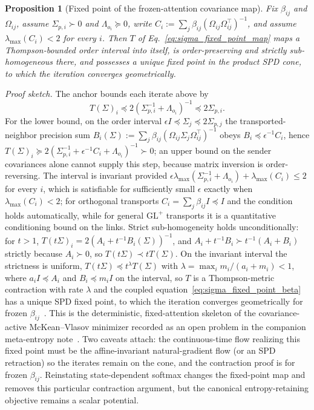 \documentclass[11pt]{article}
\newtheorem{proposition}{Proposition}
\begin{document}
\begin{proposition}[Fixed point of the frozen-attention covariance map]
Fix $\beta_{ij}$ and $\Omega_{ij}$, assume $\Sigma_{p,i} \succ 0$ and $\Lambda_{o_i} \succeq 0$, write $C_i := \sum_j \beta_{ij}(\Omega_{ij}\Omega_{ij}^\top)^{-1}$, and assume $\lambda_{\max}(C_i) < 2$ for every $i$. Then $T$ of Eq.~\eqref{eq:sigma_fixed_point_map} maps a Thompson-bounded order interval into itself, is order-preserving and strictly sub-homogeneous there, and possesses a unique fixed point in the product SPD cone, to which the iteration converges geometrically.
\end{proposition}

\emph{Proof sketch.} The anchor bounds each iterate above by
\begin{equation}
T(\Sigma)_i \preceq 2(\Sigma_{p,i}^{-1}+\Lambda_{o_i})^{-1}
\preceq 2\Sigma_{p,i}.
\end{equation}
For the lower bound, on the order interval $\epsilon I \preceq \Sigma_j \preceq 2\Sigma_{p,j}$ the transported-neighbor precision sum $B_i(\Sigma) := \sum_j \beta_{ij}(\Omega_{ij}\Sigma_j\Omega_{ij}^\top)^{-1}$ obeys $B_i \preceq \epsilon^{-1}C_i$, hence $T(\Sigma)_i \succeq 2(\Sigma_{p,i}^{-1} + \epsilon^{-1}C_i + \Lambda_{o_i})^{-1} \succ 0$; an upper bound on the sender covariances alone cannot supply this step, because matrix inversion is order-reversing. The interval is invariant provided $\epsilon\lambda_{\max}(\Sigma_{p,i}^{-1} + \Lambda_{o_i}) + \lambda_{\max}(C_i) \leq 2$ for every $i$, which is satisfiable for sufficiently small $\epsilon$ exactly when $\lambda_{\max}(C_i) < 2$; for orthogonal transports $C_i = \sum_j \beta_{ij} I \preceq I$ and the condition holds automatically, while for general $\mathrm{GL}^+$ transports it is a quantitative conditioning bound on the links. Strict sub-homogeneity holds unconditionally: for $t > 1$, $T(t\Sigma)_i = 2(A_i + t^{-1}B_i(\Sigma))^{-1}$, and $A_i + t^{-1}B_i \succ t^{-1}(A_i + B_i)$ strictly because $A_i \succ 0$, so $T(t\Sigma) \prec tT(\Sigma)$. On the invariant interval the strictness is uniform, $T(t\Sigma) \preceq t^{\lambda}T(\Sigma)$ with $\lambda = \max_i m_i/(a_i + m_i) < 1$, where $a_i I \preceq A_i$ and $B_i \preceq m_i I$ on the interval, so $T$ is a Thompson-metric contraction with rate $\lambda$ and the coupled equation~\eqref{eq:sigma_fixed_point_beta} has a unique SPD fixed point, to which the iteration converges geometrically for frozen $\beta_{ij}$~\cite{nussbaum1988hilbert, lawson2001geometric}. This is the deterministic, fixed-attention skeleton of the covariance-active McKean--Vlasov minimizer recorded as an open problem in the companion meta-entropy note~\cite{Dennis2026metaentropy}. Two caveats attach: the continuous-time flow realizing this fixed point must be the affine-invariant natural-gradient flow (or an SPD retraction) so the iterates remain on the cone, and the contraction proof is for frozen $\beta_{ij}$. Reinstating state-dependent softmax changes the fixed-point map and removes this particular contraction argument, but the canonical entropy-retaining objective remains a scalar potential.
\end{document}
